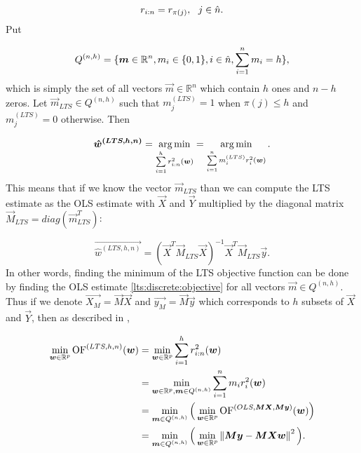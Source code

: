 \begin{equation}
    r_{i:n} = r_{\pi(j)}\\, \ \ j \in \hat{n}.
\end{equation}
Put

 \begin{equation}
   Q^{(n,h)} = \{{\vec{m} \in \mathbb{R}^n \\, m_i \in \{{0, 1\}} \\,i \in \hat{n} \\,   \sum\limits_{i=1}^n  m_i = h \}},
\end{equation}
which is simply the set of all vectors $\vec{m} \in \mathbb{R}^n$ which contain $h$ ones and $n-h$ zeros. Let $\vec{m}_{LTS} \in Q^{(n,h)}$  such that  $m^{(LTS)}_j = 1$ when $\pi(j) \leq h$ and $m^{(LTS)}_j = 0$ otherwise. Then

\begin{equation} \label{ltshat}
    \vec{\hat{w}^{(LTS, h, n)}} =  
  \argmin_{ \sum\limits_{i=1}^h r_{i:n}^2(\vec{w}) } = 
  \argmin_{ \sum\limits_{i=1}^n m^{(LTS)}_i r_{i}^2(\vec{w}) }. 
\end{equation}
This means that if we know the vector $\vec{m}_{LTS}$ than we can compute the LTS estimate as the OLS estimate with $\vec{X}$ and $\vec{Y}$ multiplied by the diagonal matrix $\vec{M}_{LTS} = diag(\vec{m}^T_{LTS})$:

\begin{equation}  \label{lts:discrete:objective}
    \vec{\hat{w}^{(LTS, h, n)}} = (\vec{X}^T\vec{M}_{LTS}\vec{X})^{-1}\vec{X}^T\vec{M}_{LTS}\vec{y}.
\end{equation}
In other words, finding the minimum of the LTS objective function can be done by finding the OLS estimate \eqref{lts:discrete:objective} for all vectors 
$\vec{m} \in Q^{(n,h)}$. 
Thus if we denote $\vec{X_{M}} = \vec{M}\vec{X} $ and $\vec{y_{M}} = \vec{M}\vec{y}$ which corresponds to $h$ subsets  of $\vec{X}$ and $\vec{Y}$, then as described in \cite{kloudaVyzkumnyUkol},




\begin{align} \label{kloudaodvozeni}
\minim_{\vec{w} \in \mathbb{R}^p} 
    \of^{(LTS, h, n)}(\vec{w})  
&=\minim_{\vec{w} \in \mathbb{R}^p} 
    \sum\limits_{i=1}^h r_{i:n}^2(\vec{w})  \\
&= \minim_{\vec{w} \in \mathbb{R}^p,\vec{m} \in Q^{(n,h)}} 
        \sum\limits_{i=1}^n m_i r_{i}^2(\vec{w})\\
&= \minim_{\vec{m} \in Q^{(n,h)}} 
            \Big( \minim_{\vec{w} \in\mathbb{R}^p} 
            \of^{(OLS,\vec{M}\vec{X},  \vec{M}\vec{y} )} (\vec{w}) \Big)\\
&= \minim_{\vec{m} \in Q^{(n,h)}} 
            \Big(\minim_{\vec{w} \in\mathbb{R}^p}  
            \norm{ \vec{M}\vec{y} -   \vec{M}\vec{X}\vec{w}  }^2 \Big).
\end{align}

